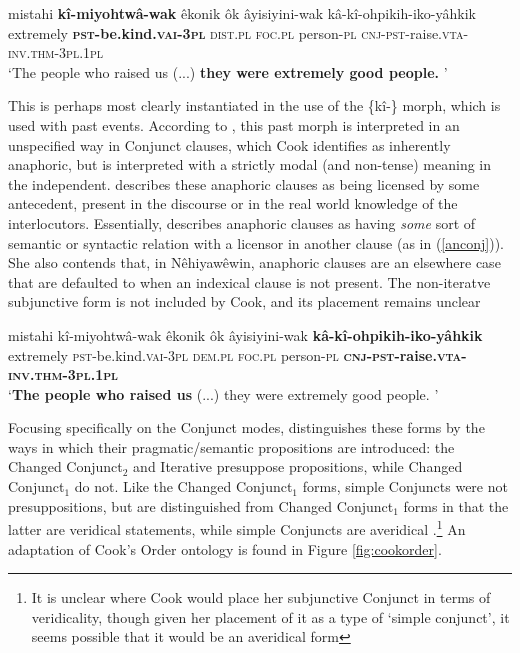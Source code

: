 \begin{exe}
\ex
\gll mistahi \textbf{kî-miyohtwâ-wak}                                 êkonik           ôk           âyisiyini-wak        kâ-kî-ohpikih-iko-yâhkik \\
     extremely \textbf{\textsc{pst}-be.kind.\textsc{vai}-3\textsc{pl}}  \textsc{dist.pl} \textsc{foc.pl} person-\textsc{pl}   \textsc{cnj-pst}-raise.\textsc{vta}-\textsc{inv.thm}-\textsc{3pl}.\textsc{1pl}                                \\
\trans `The people who raised us (...) \textbf{they were extremely good people.} \citep[38]{AhenakewAlice2000}'
\label{anconj}
\end{exe}


This is perhaps most clearly instantiated in the use of the \{kî-\} morph, which is used with past events. According to \citep[125]{Cook2014}, this past morph is interpreted in an unspecified way in Conjunct clauses, which Cook identifies as inherently anaphoric, but is interpreted with a strictly modal (and non-tense) meaning in the independent.  \citet{Cook2014} describes these anaphoric clauses as being licensed by some antecedent, present in the discourse or in the real world knowledge of the interlocutors. Essentially, \citet{Cook2014} describes anaphoric clauses as having \textit{some} sort of semantic or syntactic relation with a licensor in another clause (as in (\ref{anconj})). She also contends that, in Nêhiyawêwin, anaphoric clauses are an elsewhere case that are defaulted to when an indexical clause is not present. The non-iteratve subjunctive form is not included by Cook, and its placement remains unclear 

\begin{exe}
\ex
\gll mistahi kî-miyohtwâ-wak                                 êkonik           ôk           âyisiyini-wak        \textbf{kâ-kî-ohpikih-iko-yâhkik} \\
     extremely    \textsc{pst}-be.kind.\textsc{vai}-3\textsc{pl}  \textsc{dem.pl} \textsc{foc.pl} person-\textsc{pl}   \textbf{\textbf{\textsc{cnj-pst}-raise.\textsc{vta}-\textsc{inv.thm}-\textsc{3pl}.\textsc{1pl}}}                                \\
\trans `\textbf{The people who raised us} (...) they were extremely good people. \citep[38]{AhenakewAlice2000}'
\label{anconj}
\end{exe}


Focusing specifically on the Conjunct modes, \citep{Cook2014} distinguishes these forms by the ways in which their pragmatic/semantic propositions are introduced: the Changed Conjunct$_2$ and Iterative  presuppose propositions, while Changed Conjunct$_1$ do not. Like the Changed Conjunct$_1$ forms, simple Conjuncts were not presuppositions, but are distinguished from Changed Conjunct$_1$ forms in that the latter are veridical statements, while simple Conjuncts are averidical \citet[302]{Cook2014}.\footnote{It is unclear where Cook would place her subjunctive Conjunct in terms of veridicality, though given her placement of it as a type of `simple conjunct', it seems possible that it would be an averidical form} An adaptation of Cook's Order ontology is found in Figure \ref{fig:cookorder}. 

